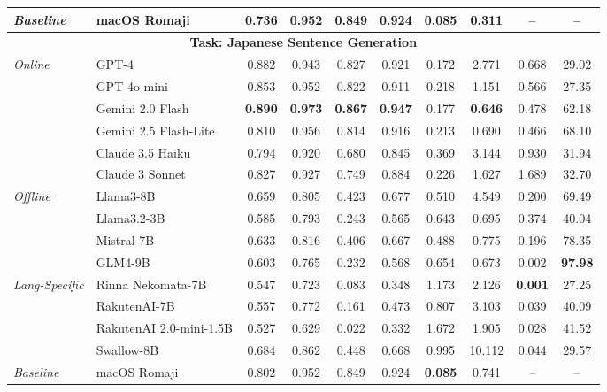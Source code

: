 \documentclass[10pt, a4paper]{article}
\begin{document}
\begin{table}[ht!]
{\begin{tabular}{l l cccccccc}
\midrule
\textit{Baseline} & macOS Romaji & 0.736 & \textbf{0.952} & 0.849 & 0.924 & \textbf{0.085} & 0.311 & -- & -- \\
\midrule
\multicolumn{10}{c}{\textbf{Task: Japanese Sentence Generation}} \\
\midrule
\textit{Online} & GPT-4 & 0.882 & 0.943 & 0.827 & 0.921 & 0.172 & 2.771 & 0.668 & 29.02 \\
& GPT-4o-mini & 0.853 & 0.952 & 0.822 & 0.911 & 0.218 & 1.151 & 0.566 & 27.35 \\
& Gemini 2.0 Flash & \textbf{0.890} & \textbf{0.973} & \textbf{0.867} & \textbf{0.947} & 0.177 & \textbf{0.646} & 0.478 & {62.18} \\
& Gemini 2.5 Flash-Lite & 0.810 & 0.956 & 0.814 & 0.916 & 0.213 & 0.690 & 0.466 & 68.10 \\
& Claude 3.5 Haiku & 0.794 & 0.920 & 0.680 & 0.845 & 0.369 & 3.144 & 0.930 & 31.94 \\
& Claude 3 Sonnet & 0.827 & 0.927 & 0.749 & 0.884 & 0.226 & 1.627 & 1.689 & 32.70 \\
\midrule
\textit{Offline} & Llama3-8B & 0.659 & 0.805 & 0.423 & 0.677 & 0.510 & 4.549 & 0.200 & 69.49 \\
& Llama3.2-3B & 0.585 & 0.793 & 0.243 & 0.565 & 0.643 & 0.695 & {0.374} & 40.04 \\
& Mistral-7B & 0.633 & 0.816 & 0.406 & 0.667 & 0.488 & 0.775 & 0.196 & 78.35 \\
& GLM4-9B & 0.603 & 0.765 & 0.232 & 0.568 & 0.654 & 0.673 & {0.002} & \textbf{97.98} \\
\midrule
\textit{Lang-Specific} & Rinna Nekomata-7B & 0.547 & 0.723 & 0.083 & 0.348 & 1.173 & 2.126 & \textbf{0.001} & 27.25 \\
& RakutenAI-7B & 0.557 & 0.772 & 0.161 & 0.473 & 0.807 & 3.103 & 0.039 & 40.09 \\
& RakutenAI 2.0-mini-1.5B & 0.527 & 0.629 & 0.022 & 0.332 & 1.672 & 1.905 & 0.028 & 41.52 \\
& Swallow-8B & 0.684 & 0.862 & 0.448 & 0.668 & 0.995 & 10.112 & 0.044 & 29.57 \\
\midrule
\textit{Baseline} & macOS Romaji & 0.802 & {0.952} & 0.849 & 0.924 & \textbf{0.085} & 0.741 & -- & -- \\
\bottomrule
\end{tabular}
}
\end{table}

\end{document}

